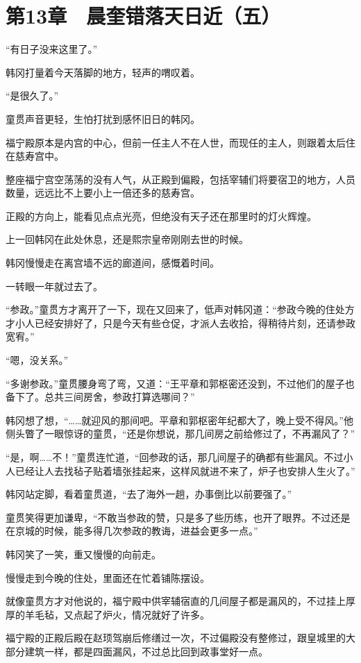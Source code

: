 \section{第13章　晨奎错落天日近（五）}

“有日子没来这里了。”

韩冈打量着今天落脚的地方，轻声的喟叹着。

“是很久了。”

童贯声音更轻，生怕打扰到感怀旧日的韩冈。

福宁殿原本是内宫的中心，但前一任主人不在人世，而现任的主人，则跟着太后住在慈寿宫中。

整座福宁宫空荡荡的没有人气，从正殿到偏殿，包括宰辅们将要宿卫的地方，人员数量，远远比不上要小上一倍还多的慈寿宫。

正殿的方向上，能看见点点光亮，但绝没有天子还在那里时的灯火辉煌。

上一回韩冈在此处休息，还是熙宗皇帝刚刚去世的时候。

韩冈慢慢走在离宫墙不远的廊道间，感慨着时间。

一转眼一年就过去了。

“参政。”童贯方才离开了一下，现在又回来了，低声对韩冈道：“参政今晚的住处方才小人已经安排好了，只是今天有些仓促，才派人去收拾，得稍待片刻，还请参政宽宥。”

“嗯，没关系。”

“多谢参政。”童贯腰身弯了弯，又道：“王平章和郭枢密还没到，不过他们的屋子也备下了。总共三间房舍，参政打算选哪间？”

韩冈想了想，“……就迎风的那间吧。平章和郭枢密年纪都大了，晚上受不得风。”他侧头瞥了一眼惊讶的童贯，“还是你想说，那几间房之前给修过了，不再漏风了？”

“是，啊……不！”童贯连忙道，“回参政的话，那几间屋子的确都有些漏风。不过小人已经让人去找毡子贴着墙张挂起来，这样风就进不来了，炉子也安排人生火了。”

韩冈站定脚，看着童贯道，“去了海外一趟，办事倒比以前要强了。”

童贯笑得更加谦卑，“不敢当参政的赞，只是多了些历练，也开了眼界。不过还是在京城的时候，能多得几次参政的教诲，进益会更多一点。”

韩冈笑了一笑，重又慢慢的向前走。

慢慢走到今晚的住处，里面还在忙着铺陈摆设。

就像童贯方才对他说的，福宁殿中供宰辅宿直的几间屋子都是漏风的，不过挂上厚厚的羊毛毡，又点起了炉火，情况就好了许多。

福宁殿的正殿后殿在赵顼驾崩后修缮过一次，不过偏殿没有整修过，跟皇城里的大部分建筑一样，都是四面漏风，不过总比回到政事堂好一点。


